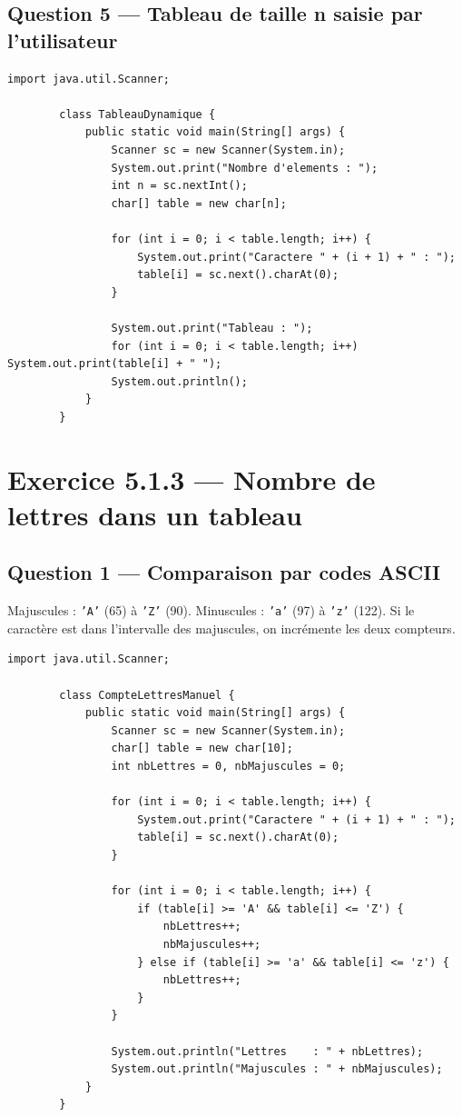 \documentclass[12pt,a4paper]{article}
\begin{document}
	\subsection*{Question 5 — Tableau de taille n saisie par l'utilisateur}
	
	\begin{lstlisting}[style=java, caption={Q5 — Tableau dynamique de n caractères}]
		import java.util.Scanner;
		
		class TableauDynamique {
			public static void main(String[] args) {
				Scanner sc = new Scanner(System.in);
				System.out.print("Nombre d'elements : ");
				int n = sc.nextInt();
				char[] table = new char[n];
				
				for (int i = 0; i < table.length; i++) {
					System.out.print("Caractere " + (i + 1) + " : ");
					table[i] = sc.next().charAt(0);
				}
				
				System.out.print("Tableau : ");
				for (int i = 0; i < table.length; i++) System.out.print(table[i] + " ");
				System.out.println();
			}
		}
	\end{lstlisting}
	
	\newpage
	\section*{Exercice 5.1.3 — Nombre de lettres dans un tableau}
	
	\subsection*{Question 1 — Comparaison par codes ASCII}
	
	\begin{boiteRaisonnement}
		Majuscules : \texttt{'A'} (65) à \texttt{'Z'} (90). Minuscules : \texttt{'a'} (97)
		à \texttt{'z'} (122). Si le caractère est dans l'intervalle des majuscules, on
		incrémente les deux compteurs.
	\end{boiteRaisonnement}
	
	\begin{lstlisting}[style=java, caption={Q1 — Comptage par comparaisons ASCII}]
		import java.util.Scanner;
		
		class CompteLettresManuel {
			public static void main(String[] args) {
				Scanner sc = new Scanner(System.in);
				char[] table = new char[10];
				int nbLettres = 0, nbMajuscules = 0;
				
				for (int i = 0; i < table.length; i++) {
					System.out.print("Caractere " + (i + 1) + " : ");
					table[i] = sc.next().charAt(0);
				}
				
				for (int i = 0; i < table.length; i++) {
					if (table[i] >= 'A' && table[i] <= 'Z') {
						nbLettres++;
						nbMajuscules++;
					} else if (table[i] >= 'a' && table[i] <= 'z') {
						nbLettres++;
					}
				}
				
				System.out.println("Lettres    : " + nbLettres);
				System.out.println("Majuscules : " + nbMajuscules);
			}
		}
	\end{lstlisting}
	
\end{document}
